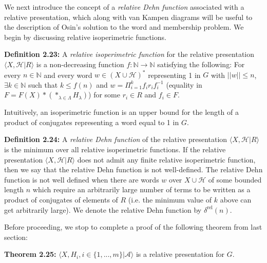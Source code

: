 \documentclass[12pt]{article}
\newcommand{\vs}{\vskip10pt}
\begin{document}
	We next introduce the concept of a \textit{relative Dehn function} associated with a relative presentation, which along with van Kampen diagrams will be useful to the description of Osin's solution to the word and membership problem. We begin by discussing relative isoperimetric functions. 
	
	\vs 
	
	\textbf{Definition 2.23: } A \textit{relative isoperimetric function} for the relative presentation $\langle X, \mathcal{H} \vert R \rangle$ is a non-decreasing function $f: \mathbb{N} \rightarrow \mathbb{N}$ satisfying the following: For every $n \in \mathbb{N}$ and every word $w \in (X \cup \mathcal{H})^*$ representing 1 in $G$ with $\vert \vert w \vert \vert \leq n$, $\exists k \in \mathbb{N}$ such that $k \leq f(n)$ and $w = \Pi_{i=1}^k f_i r_i f_i^{-1}$ (equality in $F = F(X) * (*_{\lambda \in \Lambda} H_\lambda)$) for some $r_i \in R$ and $f_i \in F$. 
	
	\vs 
	
	Intuitively, an isoperimetric function is an upper bound for the length of a product of conjugates representing a word equal to 1 in $G$. 
	
	\vs 
	
	\textbf{Definition 2.24: } A \textit{relative Dehn function} of the relative presentation  $\langle X, \mathcal{H} \vert R \rangle$ is the minimum over all relative isoperimetric functions. If the relative presentation $\langle X, \mathcal{H} \vert R \rangle$ does not admit any finite relative isoperimetric function, then we say that the relative Dehn function is not well-defined. The relative Dehn function is not well defined when there are words $w$ over $X \cup \mathcal{H}$ of some bounded length $n$ which require an arbitrarily large number of terms to be written as a product of conjugates of elements of $R$ (i.e. the minimum value of $k$ above can get arbitrarily large). We denote the relative Dehn function by $\delta^{\text{rel}}(n)$.
	
	\vs 
	
	Before proceeding, we stop to complete a proof of the following theorem from last section: 
	
	\vs 
	
	\textbf{Theorem 2.25: } $\langle X, H_i, i \in \{1,...,m\} \vert \mathcal{A} \rangle$ is a relative presentation for $G$. 
	
\end{document}
